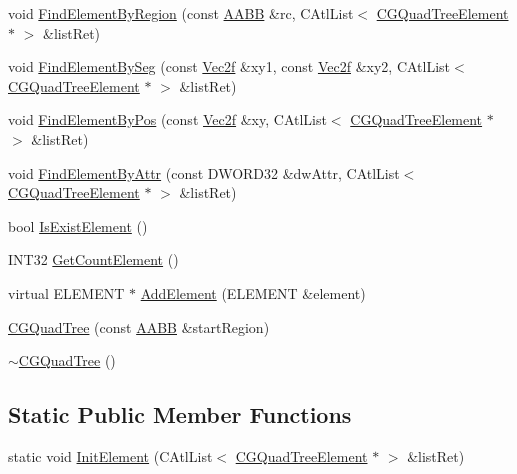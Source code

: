 \begin{DoxyCompactItemize}
\item 
void \hyperlink{class_c_g_quad_tree_ac2adf0ae2779ef580d12f187b6bdc9ac}{Find\+Element\+By\+Region} (const \hyperlink{struct_a_a_b_b}{A\+A\+B\+B} \&rc, C\+Atl\+List$<$ \hyperlink{class_c_g_quad_tree_element}{C\+G\+Quad\+Tree\+Element} $\ast$ $>$ \&list\+Ret)
\item 
void \hyperlink{class_c_g_quad_tree_a33ee431b660c2f5f605f42b4e1db9f41}{Find\+Element\+By\+Seg} (const \hyperlink{class_vec2f}{Vec2f} \&xy1, const \hyperlink{class_vec2f}{Vec2f} \&xy2, C\+Atl\+List$<$ \hyperlink{class_c_g_quad_tree_element}{C\+G\+Quad\+Tree\+Element} $\ast$ $>$ \&list\+Ret)
\item 
void \hyperlink{class_c_g_quad_tree_a74ea41913d7fca3fae276df61d695f19}{Find\+Element\+By\+Pos} (const \hyperlink{class_vec2f}{Vec2f} \&xy, C\+Atl\+List$<$ \hyperlink{class_c_g_quad_tree_element}{C\+G\+Quad\+Tree\+Element} $\ast$ $>$ \&list\+Ret)
\item 
void \hyperlink{class_c_g_quad_tree_a02597d27187c696e16960f85b065a841}{Find\+Element\+By\+Attr} (const D\+W\+O\+R\+D32 \&dw\+Attr, C\+Atl\+List$<$ \hyperlink{class_c_g_quad_tree_element}{C\+G\+Quad\+Tree\+Element} $\ast$ $>$ \&list\+Ret)
\item 
bool \hyperlink{class_c_g_quad_tree_a37925cd393647b6c70f95c899faa8f50}{Is\+Exist\+Element} ()
\item 
I\+N\+T32 \hyperlink{class_c_g_quad_tree_aa44c08b98bec2375582a582a16717766}{Get\+Count\+Element} ()
\item 
virtual E\+L\+E\+M\+E\+N\+T $\ast$ \hyperlink{class_c_g_quad_tree_aee432c03fd9016d45c8b6c555fde9925}{Add\+Element} (E\+L\+E\+M\+E\+N\+T \&element)
\item 
\hyperlink{class_c_g_quad_tree_ad13921cff7421f2d0d883e725ffe3134}{C\+G\+Quad\+Tree} (const \hyperlink{struct_a_a_b_b}{A\+A\+B\+B} \&start\+Region)
\item 
\hyperlink{class_c_g_quad_tree_a736964839ed7a0b2479c8c4f8af4bcf1}{$\sim$\+C\+G\+Quad\+Tree} ()
\end{DoxyCompactItemize}
\subsection*{Static Public Member Functions}
\begin{DoxyCompactItemize}
\item 
static void \hyperlink{class_c_g_quad_tree_a51afa9c162db376b19b751554d77e7e0}{Init\+Element} (C\+Atl\+List$<$ \hyperlink{class_c_g_quad_tree_element}{C\+G\+Quad\+Tree\+Element} $\ast$ $>$ \&list\+Ret)
\end{DoxyCompactItemize}
